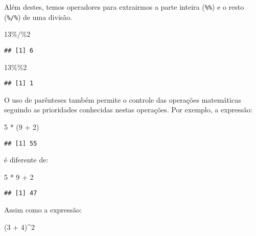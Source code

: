 \documentclass[
]{book}
\newenvironment{Shaded}{\begin{snugshade}}{\end{snugshade}}
\newcommand{\DecValTok}[1]{\textcolor[rgb]{0.00,0.00,0.81}{#1}}
\newcommand{\NormalTok}[1]{#1}
\newcommand{\SpecialCharTok}[1]{\textcolor[rgb]{0.00,0.00,0.00}{#1}}
\begin{document}
Além destes, temos operadores para extrairmos a parte inteira (\texttt{\%\%}) e o resto (\texttt{\%/\%}) de uma divisão.

\begin{Shaded}
\begin{Highlighting}[]
\DecValTok{13}\SpecialCharTok{\%/\%}\DecValTok{2}
\end{Highlighting}
\end{Shaded}

\begin{verbatim}
## [1] 6
\end{verbatim}

\begin{Shaded}
\begin{Highlighting}[]
\DecValTok{13}\SpecialCharTok{\%\%}\DecValTok{2}
\end{Highlighting}
\end{Shaded}

\begin{verbatim}
## [1] 1
\end{verbatim}

O uso de parênteses também permite o controle das operações matemáticas seguindo as prioridades conhecidas nestas operações. Por exemplo, a expressão:

\begin{Shaded}
\begin{Highlighting}[]
\DecValTok{5} \SpecialCharTok{*}\NormalTok{ (}\DecValTok{9} \SpecialCharTok{+} \DecValTok{2}\NormalTok{)}
\end{Highlighting}
\end{Shaded}

\begin{verbatim}
## [1] 55
\end{verbatim}

é diferente de:

\begin{Shaded}
\begin{Highlighting}[]
\DecValTok{5} \SpecialCharTok{*} \DecValTok{9} \SpecialCharTok{+} \DecValTok{2}
\end{Highlighting}
\end{Shaded}

\begin{verbatim}
## [1] 47
\end{verbatim}

Assim como a expressão:

\begin{Shaded}
\begin{Highlighting}[]
\NormalTok{(}\DecValTok{3} \SpecialCharTok{+} \DecValTok{4}\NormalTok{)}\SpecialCharTok{\^{}}\DecValTok{2}
\end{Highlighting}
\end{Shaded}
\end{document}
